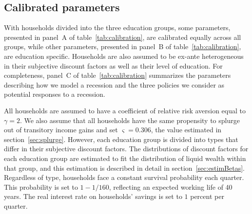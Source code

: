 \documentclass[\econtexRoot/HAFiscal]{subfiles}
\begin{document}
\subsection{Calibrated parameters} 
\notinsubfile{\label{sec:calib}}

With households divided into the three education groups, some parameters, presented in panel~A of table~\ref{tab:calibration}, are calibrated equally across all groups, while other parameters, presented in panel~B of table~\ref{tab:calibration}, are education specific.  Households are also assumed to be ex-ante heterogeneous in their subjective discount factors as well as their level of education. For completeness, panel~C of table~\ref{tab:calibration} summarizes the parameters describing how we model a recession and the three policies we consider as potential responses to a recession. 

All households are assumed to have a coefficient of relative risk aversion equal to $\gamma=2$. We also assume that all households have the same propensity to splurge out of transitory income gains and set $\varsigma=0.306$, the value estimated in section~\ref{sec:splurge}. However, each education group is divided into types that differ in their subjective discount factors. The distributions of discount factors for each education group are estimated to fit the distribution of liquid wealth within that group, and this estimation is described in detail in section~\ref{sec:estimBetas}. Regardless of type, households face a constant survival probability each quarter. This probability is set to $1-1/160$, reflecting an expected working life of 40 years. The real interest rate on households' savings is set to $1$ percent per quarter. 
\end{document}
